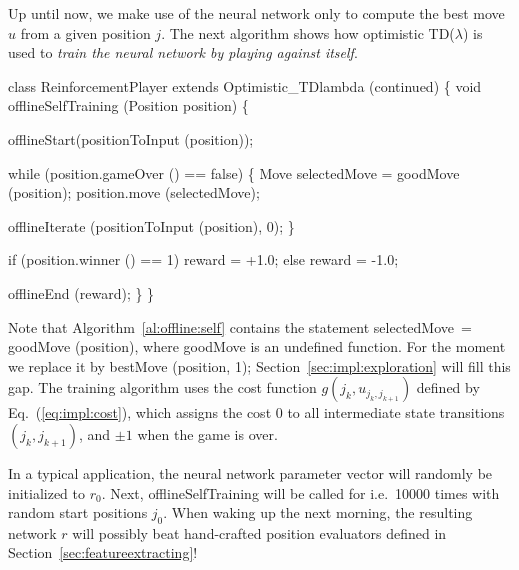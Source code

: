 Up until now, we make use of the neural network only to compute the best move $u$ from a given position $j$. The next algorithm shows how optimistic TD($\lambda$) is used to \emph{train the neural network by playing against itself}. 

\begin{algorithm} \label{al:offline:self}
class ReinforcementPlayer extends Optimistic_TDlambda (continued)
\{
  void offlineSelfTraining (Position position)
  \{
    
    offlineStart(positionToInput (position));

    while (position.gameOver () == false)
    \{
      Move selectedMove = goodMove (position);       
      position.move (selectedMove); 
      
      offlineIterate (positionToInput (position), 0);
    \}

    if (position.winner () == 1) reward = +1.0;
    else reward = -1.0;
 
    offlineEnd (reward);
  \}    
\}
\end{algorithm}

Note that Algorithm~\ref{al:offline:self} contains the statement {\al selectedMove~= goodMove (position)}, where {\al goodMove} is an undefined function. For the moment we replace it by {\al bestMove (position, 1)}; Section~\ref{sec:impl:exploration} will fill this gap. The training algorithm uses the cost function $g(j_k,u_{j_k,j_{k+1}})$ defined by Eq.~(\ref{eq:impl:cost}), which assigns the cost 0 to all intermediate state transitions $(j_k,j_{k+1})$, and $\pm1$ when the game is over. 

In a typical application, the neural network parameter vector will randomly be initialized to $r_0$. Next, {\al offlineSelfTraining} will be called for i.e.~10000 times with random start positions $j_0$. When waking up the next morning, the resulting network $r$ will possibly beat hand-crafted position evaluators defined in Section~\ref{sec:featureextracting}! 

